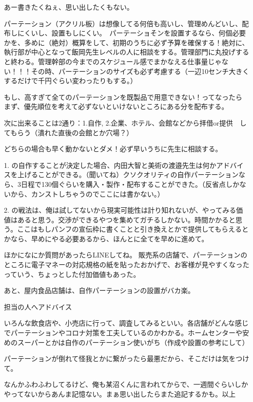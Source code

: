 \documentclass[dvipdfmx,jb5]{jarticle}
\begin{document}
あー書きたくねぇ、思い出したくもない。

パーテーション（アクリル板）は想像してる何倍も高いし、管理めんどいし、配布しにくいし、設置もしにくい。　パーテーショそンを設置するなら、何個必要かを、多めに（絶対）概算をして、初期のうちに必ず予算を確保する！絶対に、執行部が中心となって飯岡先生レベルの人に相談をする。管理部門に丸投げすると終わる。管理幹部の今までのスケジュール感でまかなえる仕事量じゃない！！！その時、パーテーションのサイズも必ず考慮する（一辺10センチ大きくするだけで千円ぐらい変わったりもする。）

もし、高すぎて全てのパーテーションを既製品で用意できない！ってなったら
まず、優先順位を考えて必ずないといけないところにある分を配布する。

次に出来ることは2通り：1.自作, 2.企業、ホテル、会館などから拝借or提供　してもらう（潰れた直後の会館とか穴場？）

どちらの場合も早く動かないとダメ！必ず早いうちに先生に相談する。

1. の自作することが決定した場合、内田大智と美術の渡邉先生は何かアドバイスを上げることができる。（聞いてね）クソクオリティの自作パーテーションなら、3日程で130個ぐらいを購入・製作・配布することができた。（反省点しかないから、カンストしちゃうのでここには書かない。）

2. の戦法は、俺は試してないから現実可能性は計り知れないが、やってみる価値はあると思う。交渉ができるやつを集めてガチるしかない。時間かかると思う。ここはもしパンフの宣伝枠に書くことと引き換えとかで提供してもらえるとかなら、早めにやる必要あるから、ほんとに全てを早めに進めて。

ほかになにか質問があったらLINEしてね。
販売系の店舗で、パーテーションのところに電子マネーの対応規格の紙を貼ったおかげで、お客様が見やすくなったっていう、ちょっとした付加価値もあった。

あと、屋内食品店舗は、自作パーテーションの設置がバカ楽。

担当の人へアドバイス

いろんな飲食店や、小売店に行って、調査してみるといい。各店舗がどんな感じでパーテーションやコロナ対策を工夫しているのかわかる。ホームセンターや安めのスーパーとかは自作のパーテーション使いがち（作成や設置の参考にして）

パーテーションが倒れて怪我とかに繋がったら最悪だから、そこだけは気をつけて。

なんかふわふわしてるけど、俺も某沼くんに言われてからで、一週間ぐらいしかやってないからあんま記憶ない。まぁ思い出したらまた追記するかも。以上
\end{document}
